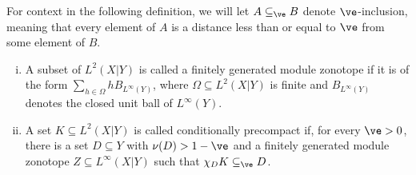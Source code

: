 \documentclass[10pt]{mypackage}
\begin{document}
For context in the following definition, we will let $A\subseteq_{\ve}B$ denote $\ve$-inclusion, meaning that every element of $A$ is a distance less than or equal to $\ve$ from some element of $B$.
\begin{definition}\hfill
  \begin{enumerate}[(i)]
    \item A subset of $L^2\left( X|Y \right)$ is called a finitely generated module zonotope if it is of the form $\sum_{h\in \Omega}h B_{L^{\infty}(Y)}$, where $\Omega\subseteq L^2\left( X|Y \right)$ is finite and $B_{L^{\infty}(Y)}$ denotes the closed unit ball of $L^{\infty}(Y)$.
    \item A set $K\subseteq L^2\left(X|Y\right)$ is called conditionally precompact if, for every $\ve > 0$, there is a set $D\subseteq Y$ with $\nu(D) > 1-\ve$ and a finitely generated module zonotope $Z\subseteq L^{\infty}\left( X|Y \right)$ such that $\chi_D K \subseteq_{\ve}D$.
  \end{enumerate}
\end{definition}
\nocite{kerr_and_li}
\printbibliography
\end{document}
